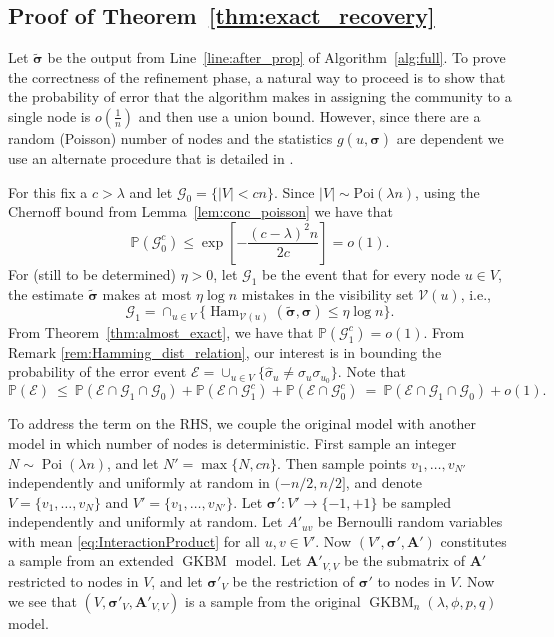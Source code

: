 \documentclass[letterpaper,11pt]{article}
\theoremstyle{definition}
\def\P{\mathbb{P}}
\def\bA{\bm{A}}
\newcommand{\hsigma}{\hat{\sigma}}
\newcommand{\bsigma}{\bm{\sigma}}
\newcommand{\tbsigma}{\tilde{\bsigma}}
\def\cE{\mathcal{E}}
\def\cG{\mathcal{G}}
\def\cV{\mathcal{V}}
\def\weq{ \ = \ }
\def\wle{ \ \le \ }
\newcommand{\Poi}{\operatorname{Poi}}
\numberwithin{equation}{section}
\newcommand{\GKBM}{\operatorname{GKBM}}
\newcommand{\la}{\lambda}
\newcommand{\Ham}{\operatorname{Ham}}
\theoremstyle{definition}
\def\P{\mathbb{P}}
\def\bA{\bm{A}}
\newcommand{\hsigma}{\hat{\sigma}}
\newcommand{\bsigma}{\bm{\sigma}}
\newcommand{\tbsigma}{\tilde{\bsigma}}
\def\cE{\mathcal{E}}
\def\cG{\mathcal{G}}
\def\cV{\mathcal{V}}
\def\weq{ \ = \ }
\def\wle{ \ \le \ }
\newcommand{\Poi}{\operatorname{Poi}}
\numberwithin{equation}{section}
\newcommand{\GKBM}{\operatorname{GKBM}}
\newcommand{\la}{\lambda}
\newcommand{\Ham}{\operatorname{Ham}}
\theoremstyle{thmstyletwo}%
\begin{document}
\subsection{Proof of Theorem~\ref{thm:exact_recovery}}
Let $\tbsigma$ be the output from Line~\ref{line:after_prop} of Algorithm~\ref{alg:full}.
To prove the correctness of the refinement phase, a natural way to proceed is to show that the probability of error that the algorithm makes in assigning the community to a single node is $o(\frac{1}{n})$ and then use a union bound. However, since there are a random (Poisson) number of nodes and the statistics $g(u,\hat{\bsigma})$ are dependent we use an alternate procedure that is detailed in \cite{gaudio2024exact}.

For this fix a $c>\la$ and let $\cG_0 = \{|V|<cn\}$. Since $|V|\sim \text{Poi}(\la n)$, using the Chernoff bound from Lemma~\ref{lem:conc_poisson} we have that 
$$\P(\cG_0^c) 
\le \exp \left[ -\frac{(c-\la)^2 n}{2c}\right] 
= o(1).$$ 
For (still to be determined) $\eta >0$, let $\cG_1$ be the event that for every node $u\in V$, the estimate $\tilde{\bsigma}$ makes at most $\eta \log n$ mistakes in the visibility set $\cV(u)$, i.e.,
$$\cG_1 =\cap_{u\in V}\{\Ham_{\cV(u)}(\tbsigma, \bsigma) \le \eta \log n\}.$$ From Theorem~\ref{thm:almost_exact}, we have that $\P(\cG_1^c) =o(1)$. From Remark \ref{rem:Hamming_dist_relation},
our interest is in bounding the  probability of the error event 
$\cE = \cup_{u\in V} \{\hsigma_u  \ne \sigma_u \sigma_{u_0}\}$. Note that 
\begin{equation}
\P(\cE) 
\wle \P(\cE \cap \cG_1 \cap \cG_0 ) + \P(\cE \cap \cG_1^c)+ \P(\cE \cap \cG_0^c)
\weq \P(\cE \cap \cG_1 \cap \cG_0 )+o(1).
\label{eq:error_e2}
\end{equation}



To address the term on the RHS, we couple the original model with another model in which number of nodes is deterministic.
First sample an integer $N \sim \Poi(\la n)$, and let $N' = \max\{N,cn\}$.
Then sample points $v_1,\dots,v_{N'}$ independently and uniformly at random in $(-n/2,n/2]$,
and denote $V = \{v_1,\dots,v_N\}$ and $V' = \{v_1,\dots,v_{N'}\}$.
Let $\bsigma' \colon V' \to \{-1,+1\}$ be sampled independently and uniformly at random.
Let $A'_{uv}$ be Bernoulli random variables with mean \eqref{eq:InteractionProduct} for all $u,v\in V'$.
Now $(V', \bsigma', \bA')$ constitutes a sample from an extended $\GKBM$ model.
Let $\bA'_{V,V}$ be the submatrix of $\bA'$ restricted to nodes in $V$,
and let $\bsigma'_V$ be the restriction of $\bsigma'$ to nodes in $V$.
Now we see that $(V, \bsigma'_V, \bA'_{V,V})$ is a sample from the original $\GKBM_n(\la,\phi,p,q)$ model.
\end{document}
